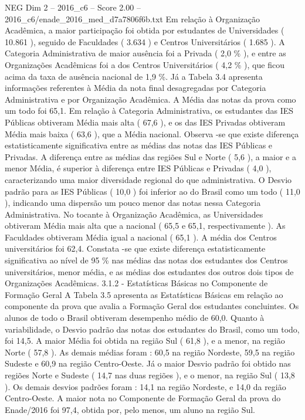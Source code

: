 \begin{textsample}{NEG Dim 2 – 2016\_c6 – Score 2.00 – 2016\_c6/enade\_2016\_med\_d7a7806f6b.txt}
Em relação à Organização Acadêmica, a maior participação foi obtida por estudantes de Universidades ( 10.861 ), seguido de Faculdades ( 3.634 ) e Centros Universitários ( 1.685 ).
A Categoria Administrativa de maior ausência foi a Privada ( 2,0 \% ), e entre as Organizações Acadêmicas foi a dos Centros Universitários ( 4,2 \% ), que ficou acima da taxa de ausência nacional de 1,9 \%.
Já a Tabela 3.4 apresenta informações referentes à Média da nota final desagregadas por Categoria Administrativa e por Organização Acadêmica.
A Média das notas da prova como um todo foi 65,1.
Em relação à Categoria Administrativa, os estudantes das IES Públicas obtiveram Média mais alta ( 67,6 ), e os das IES Privadas obtiveram Média mais baixa ( 63,6 ), que a Média nacional.
Observa -se que existe diferença estatisticamente significativa entre as médias das notas das IES Públicas e Privadas.
A diferença entre as médias das regiões Sul e Norte ( 5,6 ), a maior e a menor Média, é superior à diferença entre IES Públicas e Privadas ( 4,0 ), caracterizando uma maior diversidade regional do que administrativa.
O Desvio padrão para as IES Públicas ( 10,0 ) foi inferior ao do Brasil como um todo ( 11,0 ), indicando uma dispersão um pouco menor das notas nessa Categoria Administrativa.
No tocante à Organização Acadêmica, as Universidades obtiveram Média mais alta que a nacional ( 65,5 e 65,1, respectivamente ).
As Faculdades obtiveram Média igual a nacional ( 65,1 ).
A média dos Centros universitários foi 62,4.
Constata -se que existe diferença estatisticamente significativa ao nível de 95 \% nas médias das notas dos estudantes dos Centros universitários, menor média, e as médias dos estudantes dos outros dois tipos de Organizações Acadêmicas. 3.1.2 - Estatísticas Básicas no Componente de Formação Geral A Tabela 3.5 apresenta as Estatísticas Básicas em relação ao componente da prova que avalia a Formação Geral dos estudantes concluintes.
Os alunos de todo o Brasil obtiveram desempenho médio de 60,0.
Quanto à variabilidade, o Desvio padrão das notas dos estudantes do Brasil, como um todo, foi 14,5.
A maior Média foi obtida na região Sul ( 61,8 ), e a menor, na região Norte ( 57,8 ).
As demais médias foram : 60,5 na região Nordeste, 59,5 na região Sudeste e 60,9 na região Centro-Oeste.
Já o maior Desvio padrão foi obtido nas regiões Norte e Sudeste ( 14,7 nas duas regiões ), e o menor, na região Sul ( 13,8 ).
Os demais desvios padrões foram : 14,1 na região Nordeste, e 14,0 da região Centro-Oeste.
A maior nota no Componente de Formação Geral da prova do Enade/2016 foi 97,4, obtida por, pelo menos, um aluno na região Sul.

\end{textsample}
